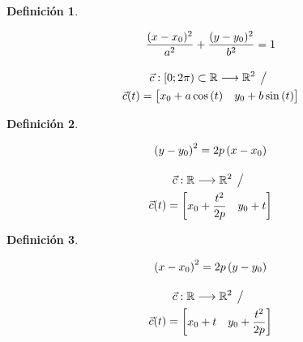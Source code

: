 \documentclass[a5paper,12pt,twoside]{book}
\newtheorem{defn}{{Definición}}[chapter]
\begin{document}
\begin{mdframed}[style=MyFrame1]
    \begin{defn}
    \end{defn}
    \begin{gather*}
        \frac{(x-x_0)^2}{a^2}+\dfrac{(y-y_0)^2}{b^2}=1
        \\[1em]
        \Vec{c}:[0;2 \pi) \subset \mathbb{R} \longrightarrow \mathbb{R}^2 \hspace{1ex} \big/ \hspace{1ex}
        \\
        \Vec{c}(t)= \begin{bmatrix} x_0 + a\cos{(t)} & y_0 + b\sin{(t)} \end{bmatrix}
    \end{gather*}
\end{mdframed}

\begin{mdframed}[style=MyFrame1]
    \begin{defn}
    \end{defn}
    \begin{gather*}
        \left(y-y_0\right)^2 = 2p\left(x-x_0\right)
        \\[1em]
        \Vec{c}:\mathbb{R} \longrightarrow \mathbb{R}^2 \hspace{1ex} \big/ \hspace{1ex}
        \\
        \Vec{c}(t) = \begin{bmatrix} x_0 + \dfrac{t^2}{2p} & y_0 + t \end{bmatrix}
    \end{gather*}
\end{mdframed}

\begin{mdframed}[style=MyFrame1]
    \begin{defn}
    \end{defn}
    \begin{gather*}
        \left(x-x_0\right)^2=2p\left(y-y_0\right)
        \\[1em]
        \Vec{c}:\mathbb{R} \longrightarrow \mathbb{R}^2 \hspace{1ex} \big/ \hspace{1ex}
        \\
        \Vec{c}(t) = \begin{bmatrix} x_0 + t & y_0 + \dfrac{t^2}{2p} \end{bmatrix}
    \end{gather*}
\end{mdframed}
\end{document}
